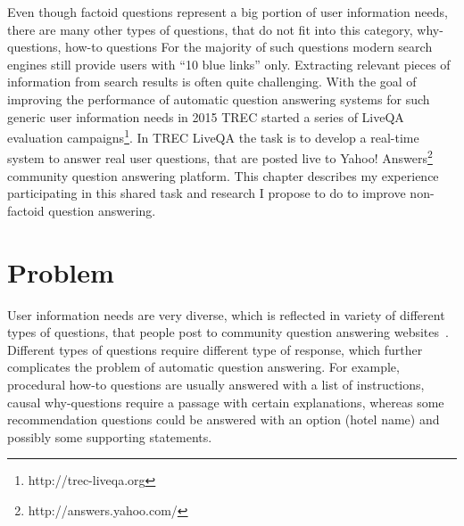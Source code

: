 %

\label{chapter:non-factoid}

\noindent

Even though factoid questions represent a big portion of user information needs, there are many other types of questions, that do not fit into this category, \eg why-questions, how-to questions \etc
For the majority of such questions modern search engines still provide users with ``10 blue links'' only.
Extracting relevant pieces of information from search results is often quite challenging.
With the goal of improving the performance of automatic question answering systems for such generic user information needs in 2015 TREC started a series of LiveQA evaluation campaigns\footnote{http://trec-liveqa.org}.
In TREC LiveQA the task is to develop a real-time system to answer real user questions, that are posted live to Yahoo! Answers\footnote{http://answers.yahoo.com/} community question answering platform.
This chapter describes my experience participating in this shared task and research I propose to do to improve non-factoid question answering.

\section{Problem}
\label{section:non-factoid:problem}

User information needs are very diverse, which is reflected in variety of different types of questions, that people post to community question answering websites~\cite{harper2010question,ignatova2009annotating,liu2008understanding}.
Different types of questions require different type of response, which further complicates the problem of automatic question answering.
For example, procedural how-to questions are usually answered with a list of instructions, causal why-questions require a passage with certain explanations, whereas some recommendation questions could be answered with an option (\eg hotel name) and possibly some supporting statements.

